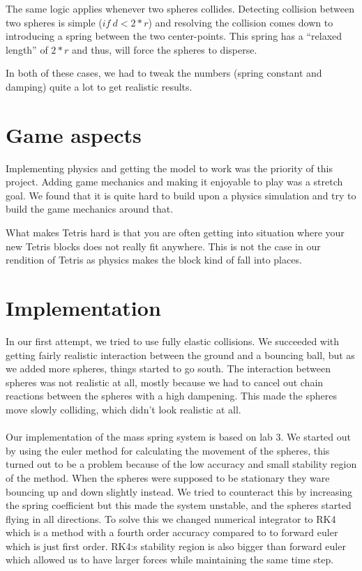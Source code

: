 \documentclass[11pt]{article} %
\begin{document}
The same logic applies whenever two spheres collides. Detecting collision between two spheres is simple ($if~d < 2 * r$) and resolving the collision comes down to introducing a spring between the two center-points. This spring has a ``relaxed length'' of $2 * r$ and thus, will force the spheres to disperse.

In both of these cases, we had to tweak the numbers (spring constant and damping) quite a lot to get realistic results.
\section{Game aspects}
Implementing physics and getting the model to work was the priority of this project. Adding game mechanics and making it enjoyable to play was a stretch goal. We found that it is quite hard to build upon a physics simulation and try to build the game mechanics around that.

What makes Tetris hard is that you are often getting into situation where your new Tetris blocks does not really fit anywhere. This is not the case in our rendition of Tetris as physics makes the block kind of fall into places.

\section{Implementation}
In our first attempt, we tried to use fully elastic collisions. We succeeded with getting fairly realistic interaction between the ground and a bouncing ball, but as we added more spheres, things started to go south. The interaction between spheres was not realistic at all, mostly because we had to cancel out chain reactions between the spheres with a high dampening. This made the spheres move slowly colliding, which didn't look realistic at all.
\\  \\
Our implementation of the mass spring system is based on lab 3. We started out by using the euler method for calculating the movement of the spheres, this turned out to be a problem because of the low accuracy and small stability region of the method. When the spheres were supposed to be stationary they ware bouncing up and down slightly instead. We tried to counteract this by increasing the spring coefficient but this made the system unstable, and the spheres started flying in all directions. To solve this we changed numerical integrator to RK4 which is a method with a fourth order accuracy compared to to forward euler which is just first order. RK4:s stability region is also bigger than forward euler which allowed us to have larger forces while maintaining the same time step.
\end{document}
